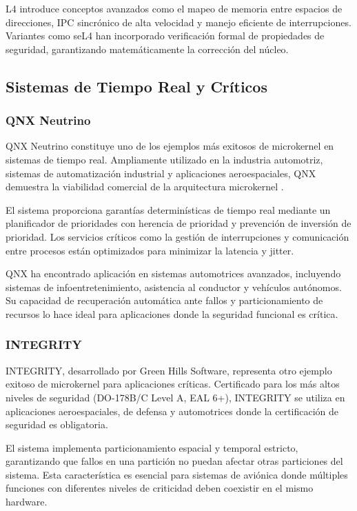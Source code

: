 \documentclass[12pt,a4paper]{article}
\begin{document}
L4 introduce conceptos avanzados como el mapeo de memoria entre espacios de direcciones, IPC sincrónico de alta velocidad y manejo eficiente de interrupciones. Variantes como seL4 han incorporado verificación formal de propiedades de seguridad, garantizando matemáticamente la corrección del núcleo.

\subsection{Sistemas de Tiempo Real y Críticos}

\subsubsection{QNX Neutrino}

QNX Neutrino constituye uno de los ejemplos más exitosos de microkernel en sistemas de tiempo real. Ampliamente utilizado en la industria automotriz, sistemas de automatización industrial y aplicaciones aeroespaciales, QNX demuestra la viabilidad comercial de la arquitectura microkernel \cite{qnxdoc}.

El sistema proporciona garantías determinísticas de tiempo real mediante un planificador de prioridades con herencia de prioridad y prevención de inversión de prioridad. Los servicios críticos como la gestión de interrupciones y comunicación entre procesos están optimizados para minimizar la latencia y jitter.

QNX ha encontrado aplicación en sistemas automotrices avanzados, incluyendo sistemas de infoentretenimiento, asistencia al conductor y vehículos autónomos. Su capacidad de recuperación automática ante fallos y particionamiento de recursos lo hace ideal para aplicaciones donde la seguridad funcional es crítica.

\subsubsection{INTEGRITY}

INTEGRITY, desarrollado por Green Hills Software, representa otro ejemplo exitoso de microkernel para aplicaciones críticas. Certificado para los más altos niveles de seguridad (DO-178B/C Level A, EAL 6+), INTEGRITY se utiliza en aplicaciones aeroespaciales, de defensa y automotrices donde la certificación de seguridad es obligatoria.

El sistema implementa particionamiento espacial y temporal estricto, garantizando que fallos en una partición no puedan afectar otras particiones del sistema. Esta característica es esencial para sistemas de aviónica donde múltiples funciones con diferentes niveles de criticidad deben coexistir en el mismo hardware.
\end{document}
